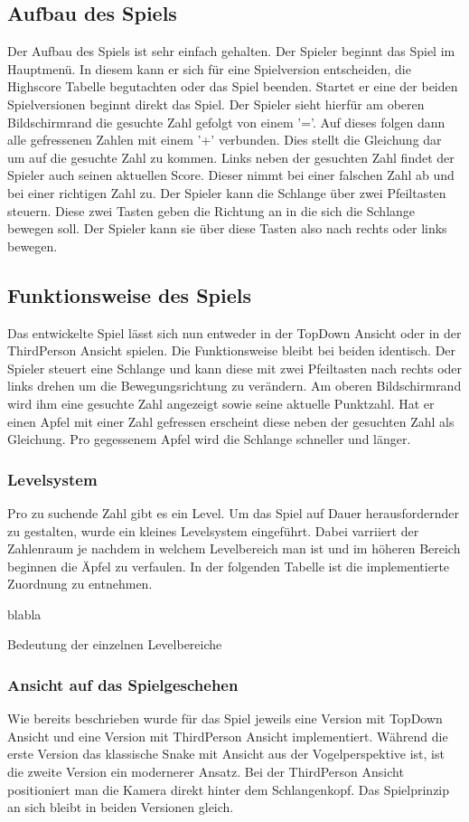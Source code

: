 \subsection{Aufbau des Spiels}
Der Aufbau des Spiels ist sehr einfach gehalten. Der Spieler beginnt das Spiel im Hauptmenü. In diesem kann er sich für eine Spielversion entscheiden, die Highscore Tabelle begutachten oder das Spiel beenden. Startet er eine der beiden Spielversionen beginnt direkt das Spiel. 
Der Spieler sieht hierfür am oberen Bildschirmrand die gesuchte Zahl gefolgt von einem '='. Auf dieses folgen dann alle gefressenen Zahlen mit einem '+' verbunden. Dies stellt die Gleichung dar um auf die gesuchte Zahl zu kommen. Links neben der gesuchten Zahl findet der Spieler auch seinen aktuellen Score. Dieser nimmt bei einer falschen Zahl ab und bei einer richtigen Zahl zu. Der Spieler kann die Schlange über zwei Pfeiltasten steuern. Diese zwei Tasten geben die Richtung an in die sich die Schlange bewegen soll. Der Spieler kann sie über diese Tasten also nach rechts oder links bewegen. 
\subsection{Funktionsweise des Spiels}
Das entwickelte Spiel lässt sich nun entweder in der TopDown Ansicht oder in der ThirdPerson Ansicht spielen. Die Funktionsweise bleibt bei beiden identisch. Der Spieler steuert eine Schlange und kann diese mit zwei Pfeiltasten nach rechts oder links drehen um die Bewegungsrichtung zu verändern. Am oberen Bildschirmrand wird ihm eine gesuchte Zahl angezeigt sowie seine aktuelle Punktzahl. Hat er einen Apfel mit einer Zahl gefressen erscheint diese neben der gesuchten Zahl als Gleichung. Pro gegessenem Apfel wird die Schlange schneller und länger.
\subsubsection{Levelsystem}
Pro zu suchende Zahl gibt es ein Level. Um das Spiel auf Dauer herausfordernder zu gestalten, wurde ein kleines Levelsystem eingeführt. Dabei varriiert der Zahlenraum je nachdem in welchem Levelbereich man ist und im höheren Bereich beginnen die Äpfel zu verfaulen. In der folgenden Tabelle ist die implementierte Zuordnung zu entnehmen.

\begin{table}[h]
blabla
\caption{Bedeutung der einzelnen Levelbereiche\label{tab:levels}}
\end{table}
\subsubsection{Ansicht auf das Spielgeschehen}
Wie bereits beschrieben wurde für das Spiel jeweils eine Version mit TopDown Ansicht und eine Version mit ThirdPerson Ansicht implementiert. Während die erste Version das klassische Snake mit Ansicht aus der Vogelperspektive ist, ist die zweite Version ein modernerer Ansatz. Bei der ThirdPerson Ansicht positioniert man die Kamera direkt hinter dem Schlangenkopf. Das Spielprinzip an sich bleibt in beiden Versionen gleich.


